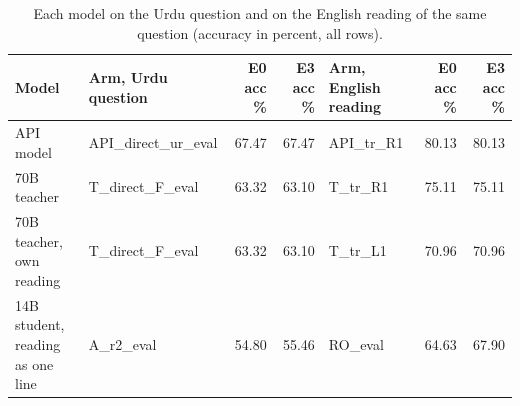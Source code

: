 \begin{table}[t]
\centering
\small
\caption{Each model on the Urdu question and on the English reading of the same question (accuracy in percent, all rows).}
\label{tab:d13-reading-effect}
\begin{tabular}{llrrlrr}
\toprule
Model & Arm, Urdu question & E0 acc \% & E3 acc \% & Arm, English reading & E0 acc \% & E3 acc \% \\
\midrule
API model & API\_direct\_ur\_eval & 67.47 & 67.47 & API\_tr\_R1 & 80.13 & 80.13 \\
70B teacher & T\_direct\_F\_eval & 63.32 & 63.10 & T\_tr\_R1 & 75.11 & 75.11 \\
70B teacher, own reading & T\_direct\_F\_eval & 63.32 & 63.10 & T\_tr\_L1 & 70.96 & 70.96 \\
14B student, reading as one line & A\_r2\_eval & 54.80 & 55.46 & RO\_eval & 64.63 & 67.90 \\
\bottomrule
\end{tabular}
\end{table}
